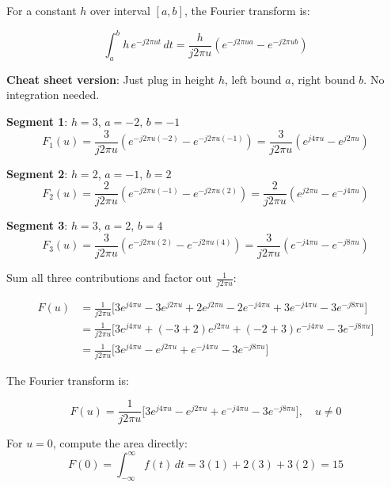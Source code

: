\documentclass[12pt]{article}
\begin{document}
\begin{stepbox}

For a constant $h$ over interval $[a, b]$, the Fourier transform is:

\[
\boxed{\int_a^b h\, e^{-j2\pi ut}\,dt = \frac{h}{j2\pi u}\left(e^{-j2\pi ua} - e^{-j2\pi ub}\right)}
\]

\textbf{Cheat sheet version}: Just plug in height $h$, left bound $a$, right bound $b$. No integration needed.

\end{stepbox}

\begin{stepbox}

\textbf{Segment 1}: $h = 3$, $a = -2$, $b = -1$
\[
F_1(u) = \frac{3}{j2\pi u}\left(e^{-j2\pi u(-2)} - e^{-j2\pi u(-1)}\right) = \frac{3}{j2\pi u}\left(e^{j4\pi u} - e^{j2\pi u}\right)
\]

\textbf{Segment 2}: $h = 2$, $a = -1$, $b = 2$
\[
F_2(u) = \frac{2}{j2\pi u}\left(e^{-j2\pi u(-1)} - e^{-j2\pi u(2)}\right) = \frac{2}{j2\pi u}\left(e^{j2\pi u} - e^{-j4\pi u}\right)
\]

\textbf{Segment 3}: $h = 3$, $a = 2$, $b = 4$
\[
F_3(u) = \frac{3}{j2\pi u}\left(e^{-j2\pi u(2)} - e^{-j2\pi u(4)}\right) = \frac{3}{j2\pi u}\left(e^{-j4\pi u} - e^{-j8\pi u}\right)
\]

\end{stepbox}

\begin{stepbox}

Sum all three contributions and factor out $\frac{1}{j2\pi u}$:

\begin{align*}
F(u) &= \frac{1}{j2\pi u}\Big[3e^{j4\pi u} - 3e^{j2\pi u} + 2e^{j2\pi u} - 2e^{-j4\pi u} + 3e^{-j4\pi u} - 3e^{-j8\pi u}\Big] \\[0.5em]
&= \frac{1}{j2\pi u}\Big[3e^{j4\pi u} + (-3+2)e^{j2\pi u} + (-2+3)e^{-j4\pi u} - 3e^{-j8\pi u}\Big] \\[0.5em]
&= \frac{1}{j2\pi u}\Big[3e^{j4\pi u} - e^{j2\pi u} + e^{-j4\pi u} - 3e^{-j8\pi u}\Big]
\end{align*}

\end{stepbox}

\begin{resultsbox}

The Fourier transform is:

\[
\boxed{F(u) = \frac{1}{j2\pi u}\Big[3e^{j4\pi u} - e^{j2\pi u} + e^{-j4\pi u} - 3e^{-j8\pi u}\Big], \quad u \neq 0}
\]

\vspace{0.3cm}

For $u = 0$, compute the area directly:
\[
F(0) = \int_{-\infty}^{\infty} f(t)\,dt = 3(1) + 2(3) + 3(2) = 15
\]

\end{resultsbox}

\end{document}
